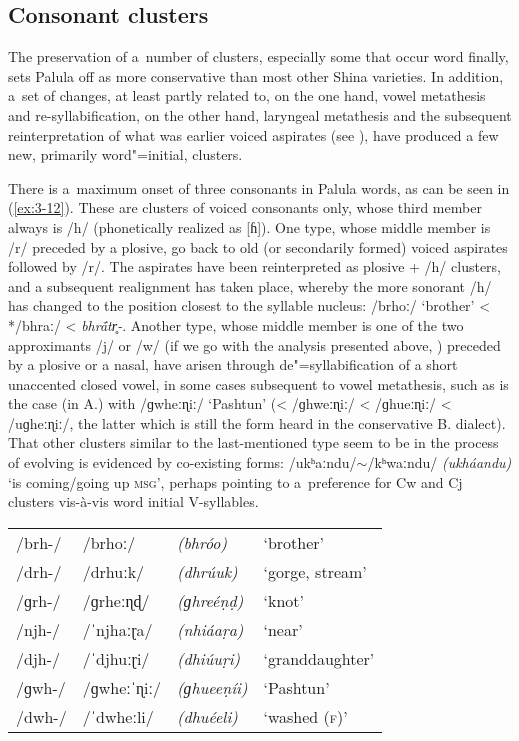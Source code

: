 \subsection{Consonant clusters}
\label{subsec:3-3-2}


The preservation of a~number of clusters, especially some that occur word finally, sets Palula off as more conservative than most other Shina varieties. In addition, a~set of changes, at least partly related to, on the one hand, vowel metathesis and re-syllabification, on the other hand, laryngeal metathesis and the subsequent reinterpretation of what was earlier voiced aspirates (see ), have produced a few new, primarily word"=initial, clusters.


There is a~maximum onset of three consonants in Palula words, as can be seen in (\ref{ex:3-12}). These are clusters of voiced consonants only, whose third member always is /h/ (phonetically realized as [ɦ]).  One type, whose middle member is /r/ preceded by a plosive, go back to old (or secondarily formed) voiced aspirates followed by /r/. The aspirates have been reinterpreted as plosive + /h/ clusters, and a subsequent realignment has taken place, whereby the more sonorant /h/ has changed to the position closest to the syllable nucleus: /brhoː/ `brother' < */bhraː/ < \textit{bhr\'{\={a}}tr̥-}. Another type, whose middle member is one of the two approximants /j/ or /w/ (if we go with the analysis presented above, ) preceded by a plosive or a nasal, have arisen through de"=syllabification of a short unaccented closed vowel, in some cases subsequent to vowel metathesis, such as is the case (in A.) with /ɡwheːɳiː/ `Pashtun' (< /ɡhweːɳiː/ < /ɡhueːɳiː/ < /uɡheːɳiː/, the latter which is still the form heard in the conservative B. dialect). That other clusters similar to the last-mentioned type seem to be in the process of evolving is evidenced by co-existing forms: /ukʰaːndu/$\sim$/kʰwaːndu/ \textit{(ukháandu)} `is coming/going up \textsc{msg}', perhaps pointing to a~preference for Cw and Cj clusters vis-à-vis word initial V-syllables. 


\begin{exe}
\extab
\label{ex:3-12}
\begin{tabular}{ l l l l }
/brh-/ &
/brhoː/ &
\textit{(bhróo)} &
`brother'\\
/drh-/ &
/drhuːk/ &
\textit{(dhrúuk)} &
`gorge, stream' \\
/ɡrh-/ &
/ɡrheːɳɖ/ &
\textit{(ɡhreéṇḍ)} &
`knot' \\
/njh-/ &
/ˈnjhaːɽa/ &
\textit{(nhiáaṛa)} &
`near'\\
/djh-/ &
/ˈdjhuːɽi/ &
\textit{(dhiúuṛi)} &
`granddaughter'\\
/ɡwh-/ &
/ɡwheːˈɳiː/ &
\textit{(ɡhueeṇíi)} &
`Pashtun'\\
/dwh-/ &
/ˈdwheːli/ &
\textit{(dhuéeli)} &
`washed (\textsc{f)}'\\
\end{tabular}
\end{exe}


